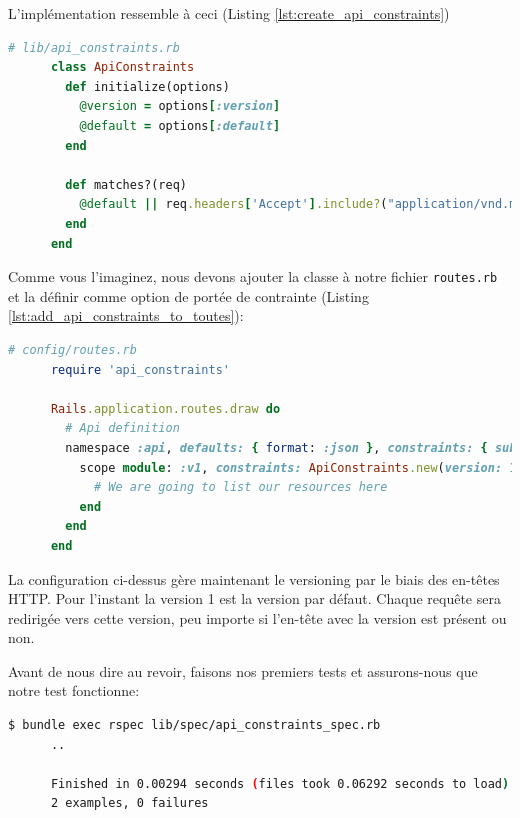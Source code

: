\documentclass[]{report}
\begin{document}
    L'implémentation ressemble à ceci (Listing \ref{lst:create_api_constraints})

    \begin{scriptsize}
      \begin{lstlisting}[language=ruby, caption={La classe ApiConstraints}, label={lst:create_api_constraints}]
      # lib/api_constraints.rb
      class ApiConstraints
        def initialize(options)
          @version = options[:version]
          @default = options[:default]
        end

        def matches?(req)
          @default || req.headers['Accept'].include?("application/vnd.marketplace.v#{@version}")
        end
      end
      \end{lstlisting}
    \end{scriptsize}

    Comme vous l'imaginez, nous devons ajouter la classe à notre fichier \verb|routes.rb| et la définir comme option de portée de contrainte (Listing \ref{lst:add_api_constraints_to_toutes}):

    \begin{scriptsize}
      \begin{lstlisting}[language=ruby, caption={Ajout de la contrainte à la route}, label={lst:add_api_constraints_to_toutes}]
      # config/routes.rb
      require 'api_constraints'

      Rails.application.routes.draw do
        # Api definition
        namespace :api, defaults: { format: :json }, constraints: { subdomain: 'api' }, path: '/' do
          scope module: :v1, constraints: ApiConstraints.new(version: 1, default: true) do
            # We are going to list our resources here
          end
        end
      end
      \end{lstlisting}
    \end{scriptsize}

    La configuration ci-dessus gère maintenant le versioning par le biais des en-têtes HTTP. Pour l'instant la version 1 est la version par défaut. Chaque requête sera redirigée vers cette version, peu importe si l'en-tête avec la version est présent ou non.

    Avant de nous dire au revoir, faisons nos premiers tests et assurons-nous que notre test fonctionne:

    \begin{scriptsize}
      \begin{lstlisting}[language=bash]
      $ bundle exec rspec lib/spec/api_constraints_spec.rb
      ..

      Finished in 0.00294 seconds (files took 0.06292 seconds to load)
      2 examples, 0 failures
      \end{lstlisting}
    \end{scriptsize}
\end{document}
